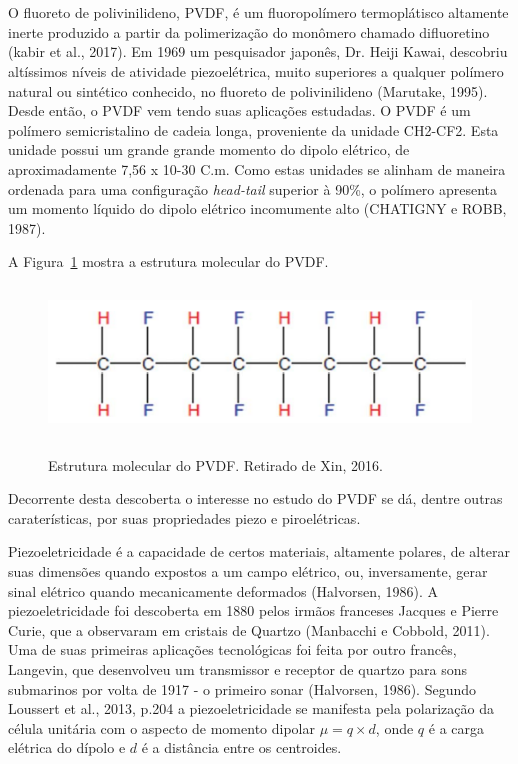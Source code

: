 \documentclass[
	12pt,				
	oneside,			
	a4paper,			
	english,			
	brazil,			
	]{abntex2ppgsi}
\begin{document}
\newpage
\section{}

O fluoreto de polivinilideno, PVDF, é um fluoropolímero termoplátisco altamente inerte produzido a partir da polimerização do monômero chamado difluoretino (kabir et al., 2017). Em 1969 um pesquisador japonês, Dr. Heiji Kawai, descobriu altíssimos níveis de atividade piezoelétrica, muito superiores a qualquer polímero natural ou sintético conhecido, no fluoreto de polivinilideno (Marutake, 1995). Desde então, o PVDF vem tendo suas aplicações estudadas. O PVDF é um polímero semicristalino de cadeia longa, proveniente da unidade CH2-CF2. Esta unidade possui um grande grande momento do dipolo elétrico, de aproximadamente 7,56 x 10-30 C.m. Como estas unidades se alinham de maneira ordenada para uma configuração \textit{head-tail} superior à 90\%, o polímero apresenta um momento líquido do dipolo elétrico incomumente alto (CHATIGNY e ROBB, 1987).

A Figura~\ref{pvdf_cadeia} mostra a estrutura molecular do PVDF.

\begin{figure}[H]
\centering
\caption {Estrutura molecular do PVDF. Retirado de Xin, 2016.}
\includegraphics[width=\textwidth,height=40mm,keepaspectratio]{pvdf_cadeia}
\label{pvdf_cadeia}
\end{figure}

Decorrente desta descoberta o interesse no estudo do PVDF se dá, dentre outras caraterísticas, por suas propriedades piezo e piroelétricas. 

Piezoeletricidade é a capacidade de certos materiais, altamente polares, de alterar suas dimensões quando expostos a um campo elétrico, ou, inversamente, gerar sinal elétrico quando mecanicamente deformados (Halvorsen, 1986). A piezoeletricidade foi descoberta em 1880 pelos irmãos franceses Jacques e Pierre Curie, que a observaram em cristais de Quartzo (Manbacchi e Cobbold, 2011). Uma de suas primeiras aplicações tecnológicas foi feita por outro francês, Langevin, que desenvolveu um transmissor e receptor de quartzo para sons submarinos por volta de 1917 - o primeiro sonar (Halvorsen, 1986). Segundo Loussert et al., 2013, p.204 a piezoeletricidade se manifesta pela polarização da célula unitária com o aspecto de momento dipolar $\mu = q\times d$, onde $q$ é a carga elétrica do dípolo e $d$ é a distância entre os centroides.  
\end{document}
